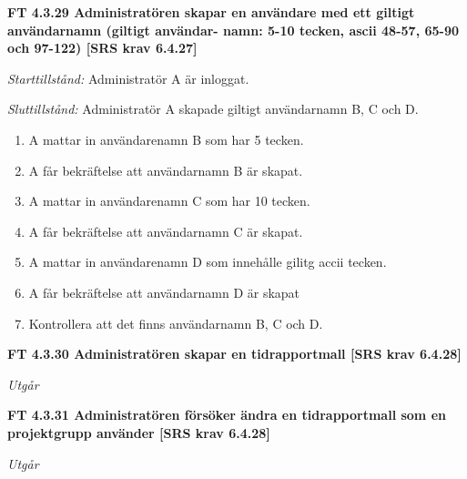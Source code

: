 \documentclass[a4paper]{article}
\begin{document}
\textbf{FT 4.3.29 Administratören skapar en användare med ett giltigt användarnamn (giltigt användar- namn: 5-10 tecken, ascii 48-57, 65-90 och 97-122) [SRS krav 6.4.27]}

\emph{Starttillstånd:} Administratör A är inloggat.

\emph{Sluttillstånd:} Administratör A skapade  giltigt användarnamn B, C och D.

\begin{enumerate}
\item A mattar in användarenamn B som har 5 tecken.
\item A får bekräftelse att användarnamn B är skapat.
\item A mattar in användarenamn C som har 10 tecken.
\item A får bekräftelse att användarnamn C är skapat.
\item A mattar in användarenamn D som innehålle gilitg accii tecken.
\item A får bekräftelse att användarnamn D är skapat
\item Kontrollera att det finns användarnamn B, C och D.
\end{enumerate}


\textbf{FT 4.3.30 Administratören skapar en tidrapportmall [SRS krav 6.4.28]}

\emph{Utgår}



\textbf{FT 4.3.31 Administratören försöker ändra en tidrapportmall som en projektgrupp använder [SRS krav 6.4.28]}

\emph{Utgår}


\end{document}
